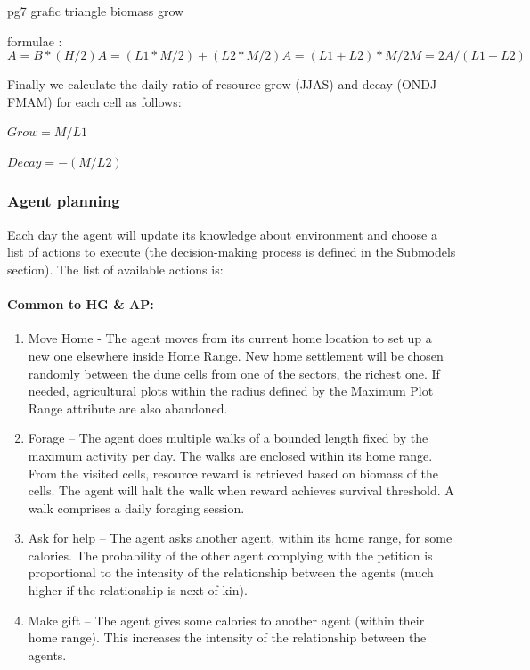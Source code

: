 pg7 grafic triangle biomass grow

formulae : 
\begin{equation}
	A=B * (H/2)
	A=(L1*M/2)+(L2*M/2)
	A=(L1+L2)*M/2
	M=2A/(L1+L2)
\end{equation}

Finally we calculate the daily ratio of resource grow (JJAS) and decay (ONDJ-FMAM) for each cell as
follows:

	$Grow = M/L1$

	$Decay = -(M/L2)$

\subsubsection{Agent planning}
Each day the agent will update its knowledge about environment and choose a list of actions to
execute (the decision-making process is defined in the Submodels section). The list of available
actions is:


\paragraph{Common to HG \& AP:}

\begin{enumerate}
\item Move Home - The agent moves from its current home location to set up a new one
elsewhere inside Home Range. New home settlement will be chosen randomly
between the dune cells from one of the sectors, the richest one. If needed, agricultural
plots within the radius defined by the Maximum Plot Range attribute are also
abandoned.
\item Forage – The agent does multiple walks of a bounded length fixed by the maximum
activity per day. The walks are enclosed within its home range. From the visited cells,
resource reward is retrieved based on biomass of the cells. The agent will halt the
walk when reward achieves survival threshold. A walk comprises a daily foraging
session.
\item Ask for help – The agent asks another agent, within its home range, for some
calories. The probability of the other agent complying with the petition is proportional
to the intensity of the relationship between the agents (much higher if the relationship
is next of kin).
\item Make gift – The agent gives some calories to another agent (within their home
range). This increases the intensity of the relationship between the agents.
\end{enumerate}


